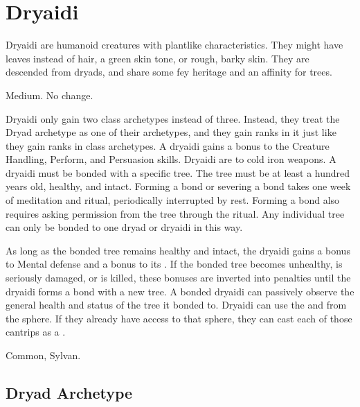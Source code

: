 \section{Dryaidi}

  Dryaidi are humanoid creatures with plantlike characteristics.
  They might have leaves instead of hair, a green skin tone, or rough, barky skin.
  They are descended from dryads, and share some fey heritage and an affinity for trees.

   Medium.
   No change.
  \begin{itemize}
     Dryaidi only gain two class archetypes instead of three.
      Instead, they treat the Dryad archetype as one of their archetypes, and they gain ranks in it just like they gain ranks in class archetypes.
     A dryaidi gains a  bonus to the Creature Handling, Perform, and Persuasion skills.
     Dryaidi are \vulnerable to cold iron weapons.
     A dryaidi must be bonded with a specific tree.
      The tree must be at least a hundred years old, healthy, and intact.
      Forming a bond or severing a bond takes one week of meditation and ritual, periodically interrupted by rest.
      Forming a bond also requires asking permission from the tree through the ritual.
      Any individual tree can only be bonded to one dryad or dryaidi in this way.

      As long as the bonded tree remains healthy and intact, the dryaidi gains a  bonus to Mental defense and a  bonus to its .
      If the bonded tree becomes unhealthy, is seriously damaged, or is killed, these bonuses are inverted into penalties until the dryaidi forms a bond with a new tree.
      A bonded dryaidi can passively observe the general health and status of the tree it bonded to.
     Dryaidi can use the  and   from the  sphere.
      If they already have access to that sphere, they can cast each of those cantrips as a .
  \end{itemize}
   Common, Sylvan.

  \subsection{Dryad Archetype}

